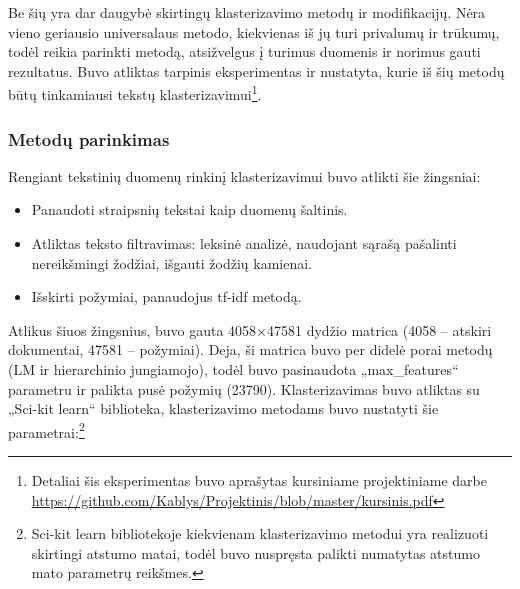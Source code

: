 \documentclass{VUMIFInfBakalaurinis}
\begin{document}
Be šių yra dar daugybė skirtingų klasterizavimo metodų ir modifikacijų.
Nėra vieno geriausio universalaus metodo, kiekvienas iš jų turi
privalumų ir trūkumų, todėl reikia parinkti metodą, atsižvelgus į
turimus duomenis ir norimus gauti rezultatus. Buvo atliktas tarpinis
eksperimentas ir nustatyta, kurie iš šių metodų būtų tinkamiausi tekstų
klasterizavimui\footnote{Detaliai šis eksperimentas buvo aprašytas
  kursiniame projektiniame darbe \url{https://github.com/Kablys/Projektinis/blob/master/kursinis.pdf}}.

\subsubsection{Metodų parinkimas}\label{clustest}

Rengiant tekstinių duomenų rinkinį klasterizavimui buvo atlikti šie
žingsniai:

\begin{itemize}
\item
  Panaudoti straipsnių tekstai kaip duomenų šaltinis.
\item
  Atliktas teksto filtravimas: leksinė analizė, naudojant sąrašą
  pašalinti nereikšmingi žodžiai, išgauti žodžių kamienai.
\item
  Išskirti požymiai, panaudojus tf-idf metodą.
\end{itemize}

Atlikus šiuos žingsnius, buvo gauta 4058×47581 dydžio matrica (4058 --
atskiri dokumentai, 47581 -- požymiai). Deja, ši matrica buvo per didelė
porai metodų (LM ir hierarchinio jungiamojo), todėl buvo pasinaudota
„max\_features“ parametru ir palikta pusė požymių (23790).
Klasterizavimas buvo atliktas su „Sci-kit learn“ biblioteka,
klasterizavimo metodams buvo nustatyti šie parametrai:\footnote{Sci-kit
  learn bibliotekoje kiekvienam klasterizavimo metodui yra realizuoti
  skirtingi atstumo matai, todėl buvo nuspręsta palikti numatytas
  atstumo mato parametrų reikšmes.}
\end{document}

